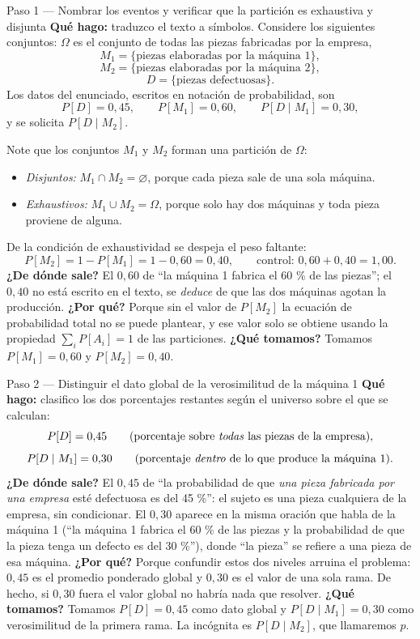 \documentclass[11pt]{article}
\begin{document}
\begin{sol}

\begin{paso}{Paso 1 --- Nombrar los eventos y verificar que la partici\'on es exhaustiva y disjunta}
\textbf{Qu\'e hago:} traduzco el texto a s\'imbolos. Considere los siguientes conjuntos: $\Omega$ es el conjunto de todas las piezas fabricadas por la empresa,
\[
M_1=\{\text{piezas elaboradas por la m\'aquina 1}\},
\]
\[
M_2=\{\text{piezas elaboradas por la m\'aquina 2}\},
\]
\[
D=\{\text{piezas defectuosas}\}.
\]
Los datos del enunciado, escritos en notaci\'on de probabilidad, son
\[
P[D]=0{,}45,\qquad P[M_1]=0{,}60,\qquad P[D\mid M_1]=0{,}30 ,
\]
y se solicita $P[D\mid M_2]$.

\medskip
Note que los conjuntos $M_1$ y $M_2$ forman una partici\'on de $\Omega$:
\begin{itemize}[leftmargin=1.4em]
\item \emph{Disjuntos:} $M_1\cap M_2=\varnothing$, porque cada pieza sale de una sola m\'aquina.
\item \emph{Exhaustivos:} $M_1\cup M_2=\Omega$, porque solo hay dos m\'aquinas y toda pieza proviene de alguna.
\end{itemize}
De la condici\'on de exhaustividad se despeja el peso faltante:
\[
P[M_2]=1-P[M_1]=1-0{,}60=0{,}40 ,
\qquad\text{control: } 0{,}60+0{,}40=1{,}00 .
\]
\textbf{¿De d\'onde sale?} El $0{,}60$ de ``la m\'aquina 1 fabrica el 60 \% de las piezas''; el $0{,}40$ no est\'a escrito en el texto, se \emph{deduce} de que las dos m\'aquinas agotan la producci\'on.
\textbf{¿Por qu\'e?} Porque sin el valor de $P[M_2]$ la ecuaci\'on de probabilidad total no se puede plantear, y ese valor solo se obtiene usando la propiedad $\sum_i P[A_i]=1$ de las particiones.
\textbf{¿Qu\'e tomamos?} Tomamos $P[M_1]=0{,}60$ y $P[M_2]=0{,}40$.
\end{paso}

\begin{paso}{Paso 2 --- Distinguir el dato global de la verosimilitud de la m\'aquina 1}
\textbf{Qu\'e hago:} clasifico los dos porcentajes restantes seg\'un el universo sobre el que se calculan:
\[
P[D]=0{,}45
\qquad\text{(porcentaje sobre \emph{todas} las piezas de la empresa)},
\]
\[
P[D\mid M_1]=0{,}30
\qquad\text{(porcentaje \emph{dentro} de lo que produce la m\'aquina 1)}.
\]
\textbf{¿De d\'onde sale?} El $0{,}45$ de ``la probabilidad de que \emph{una pieza fabricada por una empresa} est\'e defectuosa es del 45 \%'': el sujeto es una pieza cualquiera de la empresa, sin condicionar. El $0{,}30$ aparece en la misma oraci\'on que habla de la m\'aquina 1 (``la m\'aquina 1 fabrica el 60 \% de las piezas y la probabilidad de que la pieza tenga un defecto es del 30 \%''), donde ``la pieza'' se refiere a una pieza de esa m\'aquina.
\textbf{¿Por qu\'e?} Porque confundir estos dos niveles arruina el problema: $0{,}45$ es el promedio ponderado global y $0{,}30$ es el valor de una sola rama. De hecho, si $0{,}30$ fuera el valor global no habr\'ia nada que resolver.
\textbf{¿Qu\'e tomamos?} Tomamos $P[D]=0{,}45$ como dato global y $P[D\mid M_1]=0{,}30$ como verosimilitud de la primera rama. La inc\'ognita es $P[D\mid M_2]$, que llamaremos $p$.
\end{paso}


\end{sol}
\end{document}
